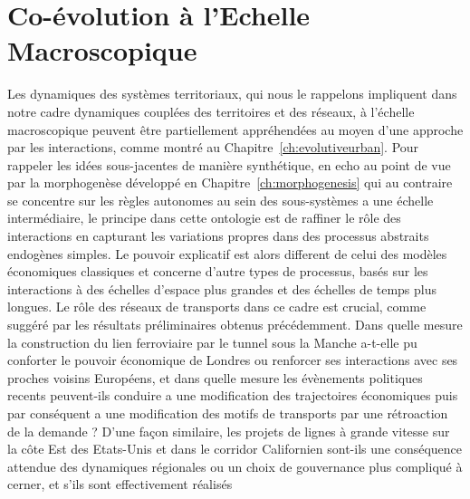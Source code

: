 
\chapter{Co-évolution à l'Echelle Macroscopique}


\label{ch:macrocoevolution} 




Les dynamiques des systèmes territoriaux, qui nous le rappelons impliquent dans notre cadre dynamiques couplées des territoires et des réseaux, à l'échelle macroscopique peuvent être partiellement appréhendées au moyen d'une approche par les interactions, comme montré au Chapitre~\ref{ch:evolutiveurban}. Pour rappeler les idées sous-jacentes de manière synthétique, en echo au point de vue par la morphogenèse développé en Chapitre~\ref{ch:morphogenesis} qui au contraire se concentre sur les règles autonomes au sein des sous-systèmes a une échelle intermédiaire, le principe dans cette ontologie est de raffiner le rôle des interactions en capturant les variations propres dans des processus abstraits endogènes simples. Le pouvoir explicatif est alors different de celui des modèles économiques classiques et concerne d'autre types de processus, basés sur les interactions à des échelles d'espace plus grandes et des échelles de temps plus longues. Le rôle des réseaux de transports dans ce cadre est crucial, comme suggéré par les résultats préliminaires obtenus précédemment. Dans quelle mesure la construction du lien ferroviaire par le tunnel sous la Manche a-t-elle pu conforter le pouvoir économique de Londres ou renforcer ses interactions avec ses proches voisins Européens, et dans quelle mesure les évènements politiques recents peuvent-ils conduire a une modification des trajectoires économiques puis par conséquent a une modification des motifs de transports par une rétroaction de la demande ? D'une façon similaire, les projets de lignes à grande vitesse sur la côte Est des Etats-Unis et dans le corridor Californien sont-ils une conséquence attendue des dynamiques régionales ou un choix de gouvernance plus compliqué à cerner, et s'ils sont effectivement réalisés %
